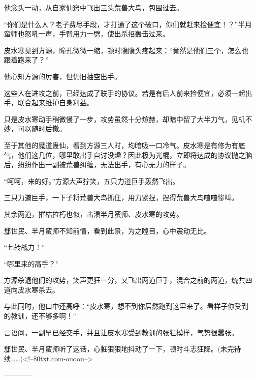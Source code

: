 \begin{this_body}
他念头一动，从自家仙窍中飞出三头荒兽大鸟，包围过去。

“你们是什么人？老子费尽手段，才打通了这个破口，你们就赶来捡便宜！？”半月蛮师也怒吼一声，手臂用力一劈，使出杀招轰击过来。

皮水寒见到方源，瞳孔微微一缩，顿时隐隐头疼起来：“竟然是他们三个，怎么也跟着跑来了？”

他心知方源的厉害，但仍旧抽空出手。

这些人在进攻之前，已经达成了联手的协议。若是有后人前来捡便宜，必须一起出手，联合起来维护自身利益。

只是皮水寒动手稍微慢了一步，攻势虽然十分煊赫，却暗中留了大半力气，见机不妙，可以随时后撤。

至于其他的魔道蛊仙，看到方源三人时，均暗吸一口冷气。皮水寒是有修为有底气，他们这几位，哪里敢出手自讨没趣？因此极为光棍，立即将达成的协议抛之脑后，纷纷作出一副被荒兽纠缠，无法出手，有心无力的样子。

“呵呵，来的好。”方源大声狞笑，五只力道巨手轰然飞出。

三只力道巨手，一下子将荒兽大鸟抓住，用力紧捏，捏得荒兽大鸟喳喳惨叫。

其余两道，摧枯拉朽也似，击溃半月蛮师、皮水寒的攻势。

郄世民、半月蛮师不知前情，看到此景，为之瞠目，心中震动无比。

“七转战力！”

“哪里来的高手？”

方源杀退他们的攻势，笑声更狂一分，又飞出两道巨手，混合之前的两道，统共四道向皮水寒杀去。

与此同时，他口中还高呼：“皮水寒，想不到你居然跑到这里来了。看样子你受到的教训，还不够多啊！”

言语间，一副早已经交手，并且让皮水寒受到教训的张狂模样，气势很嚣张。

郄世民、半月蛮师听了这话，心脏狠狠地抖动了一下，顿时斗志狂降。(未完待续……)<!--80txt.com-ouoou-->

------------

\end{this_body}

